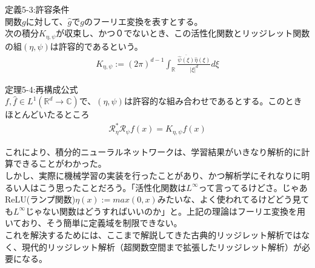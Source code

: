 \documentclass{jsarticle}
\begin{document}
定義5-3:許容条件\\
関数$g$に対して、$\hat{g}$で$g$のフーリエ変換を表すとする。\\
次の積分$K_{\eta,\psi}$が収束し、かつ０でないとき、この活性化関数とリッジレット関数の組$(\eta,\psi)$は許容的であるという。
\begin{eqnarray}
K_{\eta,\psi}:=(2\pi)^{d-1}\int_\mathbb{R}\frac{\overline{\hat{\psi}(\xi)}\hat{\eta}(\xi)}{|\xi|^d}d\xi
\end{eqnarray}

定理5-4:再構成公式\\
$f,\hat{f}\in L^1(\mathbb{R}^d\rightarrow\mathbb{C})$で、$(\eta,\psi)$は許容的な組み合わせであるとする。このときほとんどいたるところ
\begin{eqnarray}
\mathcal{R}^*_\eta\mathcal{R}_\psi f(x)=K_{\eta,\psi}f(x)
\end{eqnarray}

これにより、積分的ニューラルネットワークは、学習結果がいきなり解析的に計算できることがわかった。\\
しかし、実際に機械学習の実装を行ったことがあり、かつ解析学にそれなりに明るい人はこう思ったことだろう。「活性化関数は$L^\infty$って言ってるけどさ。じゃあReLU(ランプ関数)$\eta(x):=max(0,x)$みたいな、よく使われてるけどどう見ても$L^\infty$じゃない関数はどうすればいいのか」と。上記の理論はフーリエ変換を用いており、そう簡単に定義域を制限できない。\\
これを解決するためには、ここまで解説してきた古典的リッジレット解析ではなく、現代的リッジレット解析（超関数空間まで拡張したリッジレット解析）が必要になる。\\
\end{document}
